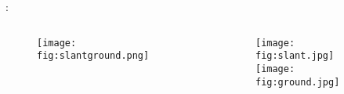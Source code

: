 \begin{frame}{\secname : \subsecname}
  \begin{columns}[t]
    \begin{column}{0.5\textwidth}
      \begin{figure}
        \centering
        \texttt{[image: fig:slantground.png]}
        \caption{}
        \label{}
      \end{figure}
    \end{column}
    \begin{column}{0.5\textwidth}  %
        \begin{figure}

          \texttt{[image: fig:slant.jpg]}\\
          \texttt{[image: fig:ground.jpg]}
          \caption{}
          \label{}
        \end{figure}
    \end{column}
    \end{columns}
\end{frame}

